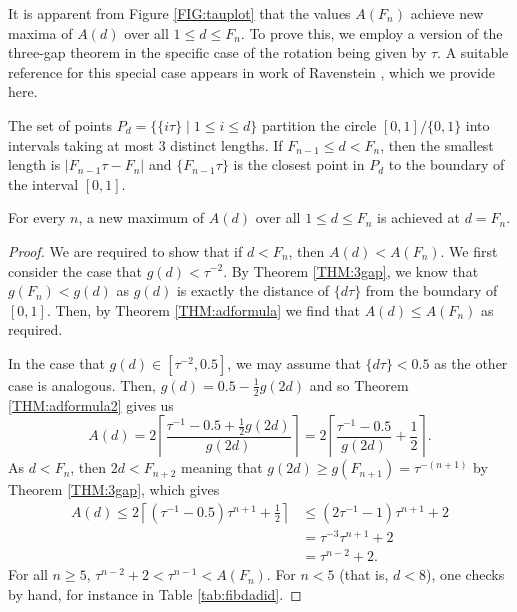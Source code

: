 \documentclass[10pt,a4paper,reqno]{amsart}
\begin{document}
It is apparent from Figure \ref{FIG:tauplot} that the values $A(F_n)$ achieve new maxima of $A(d)$ over all $1\leq d\leq F_n$.
To prove this, we employ a version of the three-gap theorem in the specific case of the rotation being given by $\tau$. A suitable reference for this special case appears in work of Ravenstein \cite[Section 3]{ravenstein1989}, which we provide here. 
\begin{theorem}\label{THM:3gap}
The set of points $P_d = \{\{ i\tau \}\mid1\leq i\leq d\}$ partition the circle $[0,1]/\{0,1\}$ into intervals taking at most $3$ distinct lengths. If $F_{n-1}\leq d<F_n$, then the smallest length is $|F_{n-1}\tau-F_n|$ and $\{ F_{n-1}\tau\}$ is the closest point in $P_d$ to the boundary of the interval $[0,1]$.
\end{theorem}
\begin{cor}\label{COR:newmaximafn}
    For every $n$, a new maximum of $A(d)$ over all $1 \leq d \leq F_n$ is achieved at $d=F_n$.
\end{cor}
\begin{proof}
We are required to show that if $d < F_n$, then $A(d) < A(F_n)$.
We first consider the case that $g(d)<\tau^{-2}$.
By Theorem \ref{THM:3gap}, we know that $g(F_n) < g(d)$ as $g(d)$ is exactly the distance of $\{d\tau\}$ from the boundary of $[0,1]$. Then, by Theorem \ref{THM:adformula} we find that $A(d) \leq A(F_n)$ as required.

In the case that $g(d) \in [\tau^{-2},0.5]$, we may assume that $\{d\tau\}<0.5$ as the other case is analogous. Then, $g(d) = 0.5-\frac{1}{2}g(2d)$ and so Theorem \ref{THM:adformula2} gives us
\[
A(d) = 2\left\lceil\frac{\tau^{-1}-0.5+\frac{1}{2}g(2d)}{g(2d)}\right\rceil = 2\left\lceil\frac{\tau^{-1}-0.5}{g(2d)}+\frac{1}{2}\right\rceil.
\]
As $d<F_n$, then $2d<F_{n+2}$ meaning that $g(2d) \geq g(F_{n+1}) = \tau^{-(n+1)}$ by Theorem \ref{THM:3gap}, which gives
\begin{align*}
A(d) \leq 2\left\lceil(\tau^{-1}-0.5)\tau^{n+1}+\frac{1}{2}\right\rceil &\leq (2\tau^{-1}-1)\tau^{n+1}+2\\
	& = \tau^{-3}\tau^{n+1}+2\\
	& = \tau^{n-2}+2.
\end{align*}
For all $n \geq 5$, $\tau^{n-2}+2<\tau^{n-1} < A(F_n)$.
For $n < 5$ (that is, $d < 8$), one checks by hand, for instance in Table \ref{tab:fibdadid}.
\end{proof}
\end{document}
